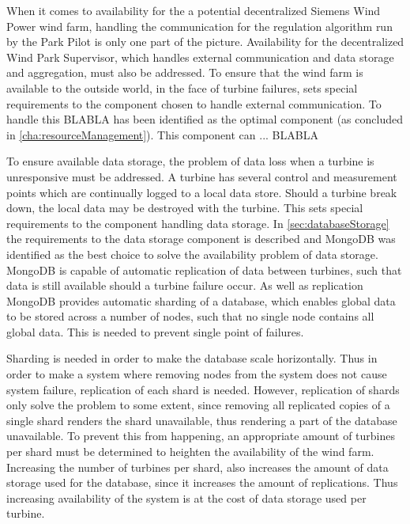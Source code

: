 
When it comes to availability for the a potential decentralized Siemens Wind Power wind farm, handling the communication for the regulation algorithm run by the Park Pilot is only one part of the picture. Availability for the decentralized Wind Park Supervisor, which handles external communication and data storage and aggregation, must also be addressed. 
To ensure that the wind farm is available to the outside world, in the face of turbine failures, sets special requirements to the component chosen to handle external communication. To handle this BLABLA has been identified as the optimal component (as concluded in \cref{cha:resourceManagement}). This component can ... BLABLA

To ensure available data storage, the problem of data loss when a turbine is unresponsive must be addressed. A turbine has several control and measurement points which are continually logged to a local data store. Should a turbine break down, the local data may be destroyed with the turbine. This sets special requirements to the component handling data storage. In \cref{sec:databaseStorage} the requirements to the data storage component is described and MongoDB was identified as the best choice to solve the availability problem of data storage. MongoDB is capable of automatic replication of data between turbines, such that data is still available should a turbine failure occur. As well as replication MongoDB provides automatic sharding of a database, which enables global data to be stored across a number of nodes, such that no single node contains all global data. This is needed to prevent single point of failures. 

Sharding is needed in order to make the database scale horizontally. Thus in order to make a system where removing nodes from the system does not cause system failure, replication of each shard is needed. However, replication of shards only solve the problem to some extent, since removing all replicated copies of a single shard renders the shard unavailable, thus rendering a part of the database unavailable. To prevent this from happening, an appropriate amount of turbines per shard must be determined to heighten the availability of the wind farm. Increasing the number of turbines per shard, also increases the amount of data storage used for the database, since it increases the amount of replications. Thus increasing availability of the system is at the cost of data storage used per turbine.

